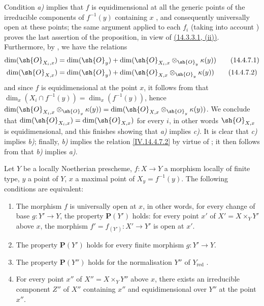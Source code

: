 Condition \emph{a)} implies that $f$ is equidimensional at all the generic points of the irreducible components of $f^{-1}(y)$ containing $x$ , and consequently  universally open at these points; the same argument applied to each $f_i$ (taking into account ) proves the last assertion of the proposition, in view of {\hyperlink{ega4.c04.subsec.14-3-3-1}{(14.3.3.1, (ii))}}.
Furthermore, by , we have the relations
\begin{align}
  \dim(\sh{O}_{X_i,x}) &= \dim(\sh{O}_y) + \dim(\sh{O}_{X_i,x}\otimes_{\sh{O}_y}\kappa(y))
  \tag{14.4.7.1}\label{IV.14.4.7.1}\\
  \dim(\sh{O}_{X,x}) &= \dim(\sh{O}_y) + \dim(\sh{O}_{X,x}\otimes_{\sh{O}_y}\kappa(y))
  \tag{14.4.7.2}\label{IV.14.4.7.2}
\end{align}
and since $f$ is equidimensional at the point $x$, it follows from  that $\dim_x(X_i\cap f^{-1}(y))=\dim_x(f^{-1}(y))$, hence  $\dim(\sh{O}_{X_i,x}\otimes_{\sh{O}_y}\kappa(y))=\dim(\sh{O}_{X,x}\otimes_{\sh{O}_y}\kappa(y))$.
We conclude that $\dim(\sh{O}_{X_i,x})=\dim(\sh{O}_{X,x})$ for every $i$, in other words $\sh{O}_{X,x}$ is equidimensional, and this finishes showing that \emph{a)} implies \emph{c)}.
It is clear that \emph{c)} implies \emph{b)}; finally, \emph{b)} implies the relation \eqref{IV.14.4.7.2} by virtue of ; it then follows from  that \emph{b)} implies \emph{a)}.

\begin{proposition}[14.4.8]
\label{IV.14.4.8}
Let $Y$ be a locally Noetherian prescheme, $f:X\to Y$ a morphism locally of finite type, $y$ a point of $Y$, $x$ a maximal point of $X_y=f^{-1}(y)$.
The following conditions are equivalent:
\begin{enumerate}[label=\emph{\alph*)}]
  \item The morphism $f$ is universally open at $x$, in other words, for every change of base $g:Y'\to Y$, the property $\mathbf{P}(Y')$ holds: for every point $x'$ of $X'=X\times_Y Y'$ above $x$, the morphism $f'=f_{(Y')}:X'\to Y'$ is open at $x'$.
  \item[\emph{a$'$)}] The property $\mathbf{P}(Y')$ holds for every finite morphism $g:Y'\to Y$.
  \item[\emph{a$''$)}] The property $\mathbf{P}(Y'')$ holds for the normalisation $Y''$ of $Y_{\mathrm{red}}$ .
  \item For every point $x''$ of $X''=X\times_Y Y''$ above $x$, there exists an irreducible component $Z''$ of $X''$ containing $x''$ and equidimensional over $Y''$ at the point $x''$.
\end{enumerate}
\end{proposition}

